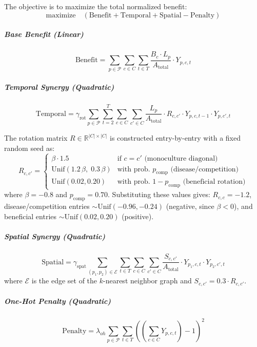 \documentclass{oqireport}
\begin{document}
The objective is to maximize the total normalized benefit:
\begin{equation}
\text{maximize} \quad \left( \text{Benefit} + \text{Temporal} + \text{Spatial} - \text{Penalty} \right)
\end{equation}

\subparagraph{Base Benefit (Linear)}
\begin{equation}
\text{Benefit} = \sum_{p \in \mathcal{P}} \sum_{c \in C} \sum_{t \in T} \frac{B_c \cdot L_p}{A_{\text{total}}} \cdot Y_{p,c,t}
\label{eq:temporal benefit}
\end{equation}

\subparagraph{Temporal Synergy (Quadratic)}
\begin{equation}
\text{Temporal} = \gamma_{\text{rot}} \sum_{p \in \mathcal{P}} \sum_{t=2}^{T} \sum_{c \in C} \sum_{c' \in C} \frac{L_p}{A_{\text{total}}} \cdot R_{c,c'} \cdot Y_{p,c,t-1} \cdot Y_{p,c',t}
\label{eq:synergy}
\end{equation}

The rotation matrix $R \in \mathbb{R}^{|C| \times |C|}$ is constructed entry-by-entry with a fixed random seed as:
\begin{equation}
R_{c,c'} = \begin{cases}
\beta \cdot 1.5 & \text{if } c = c' \text{ (monoculture diagonal)} \\
\text{Unif}(1.2\,\beta,\; 0.3\,\beta) & \text{with prob. } p_{\text{comp}} \text{ (disease/competition)} \\
\text{Unif}(0.02, 0.20) & \text{with prob. } 1-p_{\text{comp}} \text{ (beneficial rotation)}
\end{cases}
\label{eq:R_matrix}
\end{equation}
where $\beta = -0.8$ and $p_{\text{comp}} = 0.70$. Substituting these values gives: $R_{c,c} = -1.2$, disease/competition entries $\sim \text{Unif}(-0.96, -0.24)$ (negative, since $\beta < 0$), and beneficial entries $\sim \text{Unif}(0.02, 0.20)$ (positive).

\subparagraph{Spatial Synergy (Quadratic)}
\begin{equation}
\text{Spatial} = \gamma_{\text{spat}} \sum_{(p_1, p_2) \in \mathcal{E}} \sum_{t \in T} \sum_{c \in C} \sum_{c' \in C} \frac{S_{c,c'}}{A_{\text{total}}} \cdot Y_{p_1,c,t} \cdot Y_{p_2,c',t}
\end{equation}
where $\mathcal{E}$ is the edge set of the $k$-nearest neighbor graph and $S_{c,c'} = 0.3 \cdot R_{c,c'}$.

\subparagraph{One-Hot Penalty (Quadratic)}
\begin{equation}
\text{Penalty} = \lambda_{oh} \sum_{p \in \mathcal{P}} \sum_{t \in T} \left( \left(\sum_{c \in C} Y_{p,c,t}\right) -1 \right)^2
\end{equation}
\end{document}
